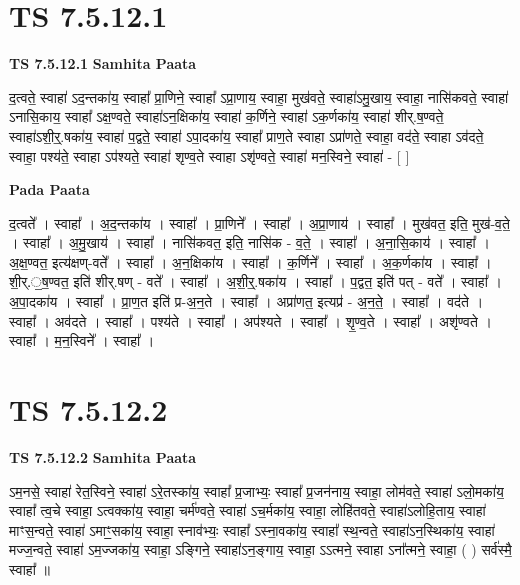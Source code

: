 \documentclass[17pt]{extarticle}
\begin{document}

\section{ TS 7.5.12.1 }

\textbf{TS 7.5.12.1 } \newline
\textbf{Samhita Paata} \newline

द॒त्वते॒ स्वाहा॑ ऽद॒न्तका॑य॒ स्वाहा᳚ प्रा॒णिने॒ स्वाहा᳚ ऽप्रा॒णाय॒ स्वाहा॒ मुख॑वते॒ स्वाहा॑ऽमु॒खाय॒ स्वाहा॒ नासि॑कवते॒ स्वाहा॑ ऽनासि॒काय॒ स्वाहा᳚ ऽक्ष॒ण्वते॒ स्वाहा॑ऽन॒क्षिका॑य॒ स्वाहा॑ क॒र्णिने॒ स्वाहा॑ ऽक॒र्णका॑य॒ स्वाहा॑ शीर्.ष॒ण्वते॒ स्वाहा॑ऽशी॒र्॒.षका॑य॒ स्वाहा॑ प॒द्वते॒ स्वाहा॑ ऽपा॒दका॑य॒ स्वाहा᳚ प्राण॒ते स्वाहा ऽप्रा॑णते॒ स्वाहा॒ वद॑ते॒ स्वाहा ऽव॑दते॒ स्वाहा॒ पश्य॑ते॒ स्वाहा ऽप॑श्यते॒ स्वाहा॑ शृण्व॒ते स्वाहा ऽशृ॑ण्वते॒ स्वाहा॑ मन॒स्विने॒ स्वाहा॑ - [  ] \newline

\textbf{Pada Paata} \newline

द॒त्वते᳚ । स्वाहा᳚ । अ॒द॒न्तका॑य । स्वाहा᳚ । प्रा॒णिने᳚ । स्वाहा᳚ । अ॒प्रा॒णाय॑ । स्वाहा᳚ । मुख॑वत॒ इति॒ मुख॑-व॒ते॒ । स्वाहा᳚ । अ॒मु॒खाय॑ । स्वाहा᳚ । नासि॑कवत॒ इति॒ नासि॑क - व॒ते॒ । स्वाहा᳚ । अ॒ना॒सि॒काय॑ । स्वाहा᳚ । अ॒क्ष॒ण्वत॒ इत्य॑क्षण्-वते᳚ । स्वाहा᳚ । अ॒न॒क्षिका॑य । स्वाहा᳚ । क॒र्णिने᳚ । स्वाहा᳚ । अ॒क॒र्णका॑य । स्वाहा᳚ । शी॒र्.॒ष॒ण्वत॒ इति॑ शीर्.षण् - वते᳚ । स्वाहा᳚ । अ॒शी॒र्॒.षका॑य । स्वाहा᳚ । प॒द्वत॒ इति॑ पत् - वते᳚ । स्वाहा᳚ । अ॒पा॒दका॑य । स्वाहा᳚ । प्रा॒ण॒त इति॑ प्र-अ॒न॒ते । स्वाहा᳚ । अप्रा॑णत॒ इत्यप्र॑ - अ॒न॒ते॒ । स्वाहा᳚ । वद॑ते । स्वाहा᳚ । अव॑दते । स्वाहा᳚ । पश्य॑ते । स्वाहा᳚ । अप॑श्यते । स्वाहा᳚ । शृ॒ण्व॒ते । स्वाहा᳚ । अशृ॑ण्वते । स्वाहा᳚ । म॒न॒स्विने᳚ । स्वाहा᳚ ।  \newline





\section{ TS 7.5.12.2 }

\textbf{TS 7.5.12.2 } \newline
\textbf{Samhita Paata} \newline

ऽम॒नसे॒ स्वाहा॑ रेत॒स्विने॒ स्वाहा॑ ऽरे॒तस्का॑य॒ स्वाहा᳚ प्र॒जाभ्यः॒ स्वाहा᳚ प्र॒जन॑नाय॒ स्वाहा॒ लोम॑वते॒ स्वाहा॑ ऽलो॒मका॑य॒ स्वाहा᳚ त्व॒चे स्वाहा॒ ऽत्वक्का॑य॒ स्वाहा॒ चर्म॑ण्वते॒ स्वाहा॑ ऽच॒र्मका॑य॒ स्वाहा॒ लोहि॑तवते॒ स्वाहा॑ऽलोहि॒ताय॒ स्वाहा॑ माꣳस॒न्वते॒ स्वाहा॑ ऽमाꣳ॒॒सका॑य॒ स्वाहा॒ स्नाव॑भ्यः॒ स्वाहा᳚ ऽस्ना॒वका॑य॒ स्वाहा᳚ स्थ॒न्वते॒ स्वाहा॑ऽन॒स्थिका॑य॒ स्वाहा॑ मज्ज॒न्वते॒ स्वाहा॑ ऽम॒ज्जका॑य॒ स्वाहा॒ ऽङ्गिने॒ स्वाहा॑ऽन॒ङ्गाय॒ स्वाहा॒ ऽऽत्मने॒ स्वाहा ऽना᳚त्मने॒ स्वाहा॒ ( ) सर्व॑स्मै॒ स्वाहा᳚ ॥ \newline
\end{document}
